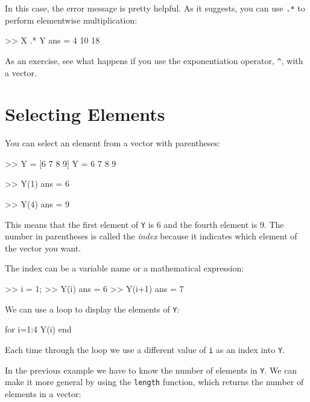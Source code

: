 In this case, the error message is pretty helpful.  As it suggests, you can use {\tt .*} to perform elementwise multiplication:


\begin{code}
>> X .* Y
ans = 4    10    18
\end{code}

As an exercise, see what happens if you use the exponentiation operator,
\verb"^", with a vector.

\section{Selecting Elements}


You can select an element from a vector with parentheses:

\begin{code}
>> Y = [6 7 8 9]
Y = 6    7     8     9

>> Y(1)
ans = 6

>> Y(4)
ans = 9
\end{code}

This means that the first element of {\tt Y} is 6 and the
fourth element is 9.
The number in parentheses is called the \emph{index} because it indicates which element of the vector you want.


The index can be a variable name or a mathematical expression:

\begin{code}
>> i = 1;
>> Y(i)
ans = 6
>> Y(i+1)
ans = 7
\end{code}

We can use a loop to display the elements of {\tt Y}:


\begin{code}
for i=1:4
     Y(i)
end
\end{code}

Each time through the loop we use a different value of {\tt i}
as an index into {\tt Y}.


In the previous example we have to know the number
of elements in {\tt Y}.  We can make it more general by using
the {\tt length} function, which returns the number of elements
in a vector:

